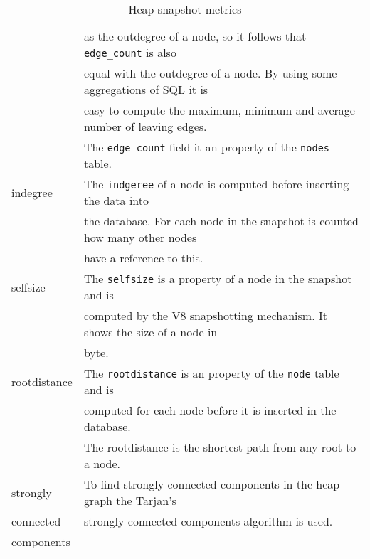 \begin{table}[!htbp]
\begin{tabular}{|l||l|}
								&	as the outdegree of a node, so it follows that \texttt{edge\_count} is also \\
								&	equal with the outdegree of a node. By using some aggregations of SQL it is \\
								&	easy to compute the maximum, minimum and average number of leaving edges. 	\\
								&	The \texttt{edge\_count} field it an property of the \texttt{nodes} table.	\\ \hline
				indegree		&	The \texttt{indgeree} of a node is computed before inserting the data into	\\
								&	the database. For each node in the snapshot is counted how many other nodes	\\
								&	have a reference to this.													\\ \hline
				selfsize		&	The \texttt{selfsize} is a property of a node in the snapshot and is 		\\
								&	computed by the V8 snapshotting mechanism. It shows the size of a node in	\\
								&	byte.																		\\ \hline 
				rootdistance	&	The \texttt{rootdistance} is an property of the \texttt{node} table and is 	\\
								&	computed for each node before it is inserted in the database. 				\\
								&	The rootdistance is the shortest path from any root to a node.				\\ \hline
				strongly		&	To find strongly connected components in the heap graph the Tarjan's 		\\ 
				connected		&	strongly connected components algorithm\cite{Trajan} is used.				\\
				components 		&																				\\ \hline
			\end{tabular}
			\caption{Heap snapshot metrics}
			\label{tap:heap_snapshot_metrics}
		\end{table}